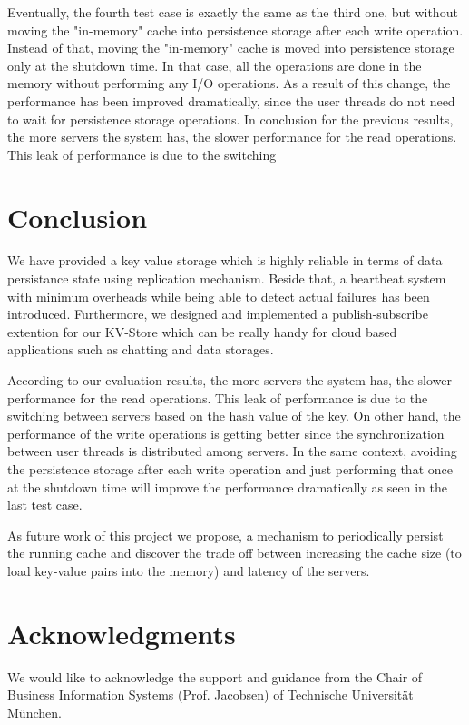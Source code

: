 \documentclass{sig-alternate}
\begin{document}
Eventually, the fourth test case is exactly the same as the third one, but without moving the "in-memory" cache into persistence storage after each write operation. Instead of that, moving the "in-memory" cache is moved into persistence storage only at the shutdown time. In that case, all the operations are done in the memory without performing any I/O operations. As a result of this change, the performance has been improved dramatically, since the user threads do not need to wait for persistence storage operations.
In conclusion for the previous results, the more servers the system has, the slower performance for the read operations. This leak of performance is due to the switching 
\section{Conclusion}
We have provided a key value storage which is highly reliable in terms of data persistance state using replication mechanism. Beside that, a heartbeat system with minimum overheads while being able to detect actual failures has been introduced. Furthermore, we designed and implemented a publish-subscribe extention for our KV-Store which can be really handy for cloud based applications such as chatting and data storages.

According to our evaluation results, the more servers the system has, the slower performance for the read operations. This leak of performance is due to the switching between servers based on the hash value of the key. On other hand, the performance of the write operations is getting better since the synchronization between user threads is distributed among servers. In the same context, avoiding the persistence storage after each write operation and just performing that once at the shutdown time will improve the performance dramatically as seen in the last test case.

As future work of this project we propose, a mechanism to periodically persist the running cache and discover the trade off between increasing the cache size (to load key-value pairs into the memory) and latency of the servers. 

\section{Acknowledgments}
We would like to acknowledge the support and guidance from the Chair of Business Information Systems (Prof. Jacobsen) of Technische Universit{\"a}t M{\"u}nchen.
%

%
%

\end{document}
